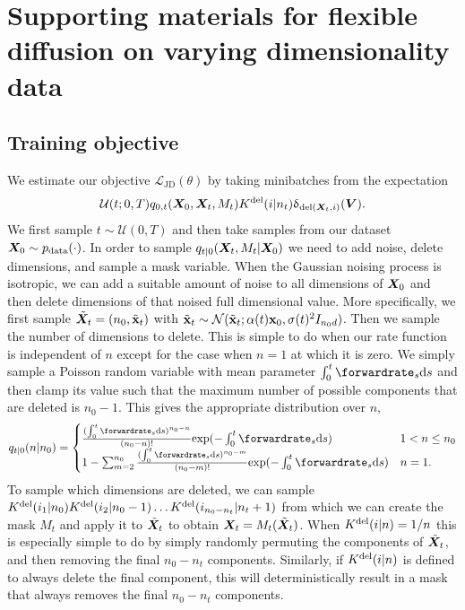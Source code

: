 \chapter{Supporting materials for flexible diffusion on varying dimensionality data}

\section{Training objective}
\label{sec:tddm-ApdxTrainingObjective}
We estimate our objective $\mathcal{L}_\text{JD}(\theta)$ by taking minibatches from the expectation 
\begin{equation}
    \mathcal{U}(t; 0, T) q_{0,t}({\bm{X}}_0, {\bm{X}}_t, M_t) K^{\textup{del}}(i | n_t) \updelta_{\text{del}({\bm{X}}_t, i)}({\bm{V}}).
\end{equation}
We first sample $t \sim \mathcal{U}(0, T)$ and then take samples from our dataset ${\bm{X}}_0 \sim p_{\rm{data}}(\cdot)$. In order to sample $q_{t|0}({\bm{X}}_t, M_t | {\bm{X}}_0)$ we need to add noise, delete dimensions, and sample a mask variable. When the Gaussian noising process is isotropic, we can add a suitable amount of noise to all dimensions of ${\bm{X}}_0$ and then delete dimensions of that noised full dimensional value. More specifically, we first sample $\tilde{{\bm{X}}}_t = (n_0, \tilde{{\mathbf{x}}}_t)$ with $\tilde{{\mathbf{x}}}_t \sim \mathcal{N}(\tilde{{\mathbf{x}}}_t; \alpha(t) {\mathbf{x}}_0, \sigma(t)^2 I_{n_0 d})$. Then we sample the number of dimensions to delete. This is simple to do when our rate function is independent of $n$ except for the case when $n=1$ at which it is zero. We simply sample a Poisson random variable with mean parameter $\int_0^t \forwardrate_s \rmd s$ and then clamp its value such that the maximum number of possible components that are deleted is $n_0 - 1$. This gives the appropriate distribution over $n$, 
\begin{equation}
    q_{t|0}(n | n_0) = \begin{cases}
         \frac{(\int_0^t \forwardrate_s \rmd s)^{n_0 - n}}{(n_0 - n)!} \text{exp}(- \int_0^t \forwardrate_s \rmd s)&\textstyle  1 < n \leq n_0 \\
        1 -  \sum_{m=2}^{n_0} \frac{(\int_0^t \forwardrate_s \rmd s)^{n_0 - m}}{(n_0 - m)!} \text{exp}(- \int_0^t \forwardrate_s \rmd s)  &\textstyle  n = 1.
    \end{cases}
\end{equation}
To sample which dimensions are deleted, we can sample $K^{\textup{del}}(i_1 | n_0) K^{\textup{del}}(i_2 | n_0-1) \dots K^{\textup{del}}(i_{n_0 - n_t} | n_t+1)$ from which we can create the mask $M_t$ and apply it to $\tilde{{\bm{X}}}_t$ to obtain ${\bm{X}}_t = M_t(\tilde{{\bm{X}}}_t)$. When $K^{\textup{del}}(i | n) = 1/n$ this is especially simple to do by simply randomly permuting the components of $\tilde{{\bm{X}}}_t$, and then removing the final $n_0 - n_t$ components. Similarly, if $K^{\textup{del}}(i | n)$ is defined to always delete the final component, this will deterministically result in a mask that always removes the final $n_0 - n_t$ components.

